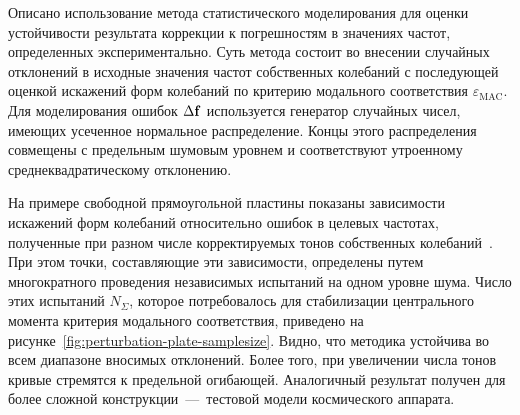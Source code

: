 Описано использование метода статистического моделирования для оценки устойчивости результата коррекции к погрешностям в значениях частот, определенных экспериментально. Суть метода состоит во внесении случайных отклонений в исходные значения частот собственных колебаний с последующей оценкой искажений форм колебаний по критерию модального соответствия $ \varepsilon_{\mathrm{MAC}} $. Для моделирования ошибок $\Delta \mathbf{f} $ используется генератор случайных чисел, имеющих усеченное нормальное распределение. Концы этого распределения совмещены с предельным шумовым уровнем и соответствуют утроенному среднеквадратическому отклонению. 

На примере свободной прямоугольной пластины показаны зависимости искажений форм колебаний относительно ошибок в целевых частотах, полученные при разном числе корректируемых тонов собственных колебаний~. При этом точки, составляющие эти зависимости, определены путем многократного проведения независимых испытаний на одном уровне шума. Число этих испытаний $ N_\Sigma $, которое потребовалось для стабилизации центрального момента критерия модального соответствия, приведено на рисунке~\ref{fig:perturbation-plate-samplesize}. Видно, что методика устойчива во всем диапазоне вносимых отклонений. Более того, при увеличении числа тонов кривые стремятся к предельной огибающей. Аналогичный результат получен для более сложной конструкции~---~тестовой модели космического аппарата.

